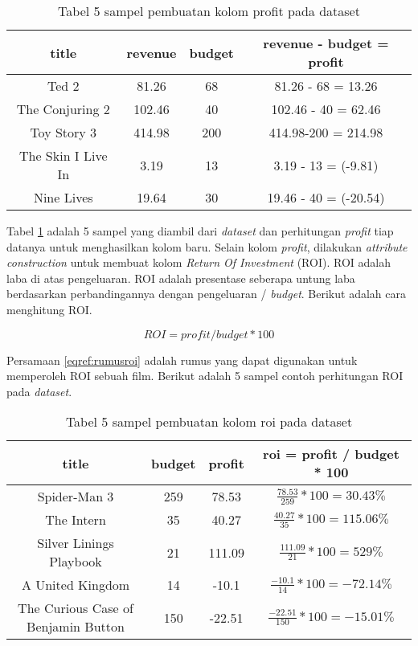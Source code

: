 \begin{table}[H]
\caption{Tabel 5 sampel pembuatan kolom profit pada  dataset}
\centering
\begin{tabular}{|c|c|c|c|}
  \hline 
  title & revenue & budget & revenue - budget = profit \\ 
  \hline 
  Ted 2 & 81.26 & 68 & 81.26 - 68 = 13.26 \\ 
  \hline 
  The Conjuring 2 & 102.46 & 40 & 102.46 - 40 = 62.46 \\ 
  \hline 
   Toy Story 3  & 414.98 & 200 & 414.98-200 = 214.98 \\ 
  \hline 
  The Skin I Live In & 3.19 & 13 & 3.19 - 13 = (-9.81) \\ 
  \hline 
  Nine Lives & 19.64 & 30 & 19.46 - 40  = (-20.54) \\ 
  \hline 
  \end{tabular}   
\label{tab:5sampel_pembuatan_profit}
\end{table}

Tabel \ref{tab:5sampel_pembuatan_profit} adalah 5 sampel yang diambil dari \textit{dataset} dan perhitungan \textit{profit} tiap datanya untuk menghasilkan kolom baru. Selain kolom \textit{profit}, dilakukan \textit{attribute construction} untuk membuat kolom \textit{Return Of Investment} (ROI). ROI adalah laba di atas pengeluaran. ROI adalah presentase seberapa untung laba berdasarkan perbandingannya dengan pengeluaran / \textit{budget}. Berikut adalah cara menghitung ROI. 

\begin{equation}
ROI = profit / budget * 100
\label{eqref:rumusroi}
\end{equation} 


Persamaan \ref{eqref:rumusroi} adalah rumus yang dapat digunakan untuk memperoleh ROI sebuah film. Berikut adalah 5 sampel contoh perhitungan ROI pada \textit{dataset}.


\begin{table}[H]
\caption{Tabel 5 sampel pembuatan kolom roi pada dataset}
\centering
\begin{tabular}{|c|c|c|c|}
\hline 
title & budget & profit & roi = profit / budget * 100 \\ 
\hline 
Spider-Man 3 & 259 & 78.53 & $\frac{78.53}{259} *100 = 30.43 \% $ \\ 
\hline 
The Intern & 35 & 40.27 & $\frac{40.27}{35}* 100 = 115.06 \% $ \\ 
\hline 
Silver Linings Playbook & 21 & 111.09 & $\frac{111.09}{21}*100 = 529  \% $ \\ 
\hline 
A United Kingdom & 14 & -10.1 & $\frac{-10.1}{14}* 100 = -72.14 \% $ \\ 
\hline 
The Curious Case of Benjamin Button & 150 & -22.51 & $\frac{-22.51}{150} * 100 = -15.01  \%$ \\ 
\hline 
\end{tabular} 
\label{tab:5sampel_pembuatan_roi}
\end{table}

